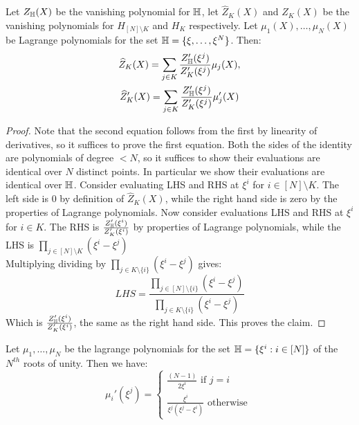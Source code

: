 \begin{lemma}\label{lem:zk-hat}
Let $Z_{\mathbb{H}}(X)$ be the vanishing polynomial for $\mathbb{H}$, let $\widehat{Z}_K(X)$ and  $Z_K(X)$ be the vanishing polynomials for $H_{[N]\setminus K}$ and $H_K$ respectively.
Let $\mu_1(X),\ldots,\mu_N(X)$ be Lagrange polynomials for the set $\mathbb{H}=\{\xi,\ldots,\xi^N\}$. Then:
\begin{gather}
    \widehat{Z}_K(X) = \sum_{j\in K}\frac{Z_{\mathbb{H}}'(\xi^j)}{Z_K'(\xi^j)}\mu_j(X), \\
    \widehat{Z}_K'(X)= \sum_{j\in K}\frac{Z_{\mathbb{H}}'(\xi^j)}{Z_K'(\xi^j)}\mu_j'(X)
\end{gather}
\end{lemma}

\begin{proof}
    Note that the second equation follows from the first by linearity of derivatives, so it suffices to prove the first equation.
    Both the sides of the identity are polynomials of degree $<N$, so it suffices to show their evaluations are identical over $N$ distinct points.
    In particular we show their evaluations are identical over $\mathbb{H}$.
    Consider evaluating LHS and RHS at $\xi^i$ for $i \in [N]\setminus K$.
    The left side is $0$ by definition of $\hat{Z}_K(X)$, while the right hand side is zero by the properties of Lagrange polynomials.
    Now consider evaluations LHS and RHS at $\xi^i$ for $i \in K$.
    The RHS is $\frac{Z_{\mathbb{H}}'(\xi^i)}{Z_K'(\xi^i)}$ by properties of Lagrange polynomials, while the
    LHS is $\prod_{j \in [N]\setminus K} (\xi^i-\xi^j)$\\
    Multiplying dividing by $\prod_{ j \in K \setminus \{i\}}(\xi^i-\xi^j)$ gives:
    $$LHS = \frac{\prod_{j \in [N] \setminus \{i\}} (\xi^i-\xi^j)}{\prod_{j \in K \setminus \{i\}}(\xi^i-\xi^j)}$$
    Which is $\frac{Z_{\mathbb{H}}'(\xi^i)}{Z_K'(\xi^i)}$, the same as the right hand side.
    This proves the claim.
\end{proof}

\begin{lemma}\label{lem:lamda-deriv}
Let $\mu_1,\ldots,\mu_N$ be the lagrange polynomials for the set $\mathbb{H}=\{\xi^i:i\in [N]\}$
of the $N^{th}$ roots of unity. Then we have:
\begin{equation*}
    \mu_i'(\xi^j) = \begin{cases}
                        \frac{(N-1)}{2\xi^{i}}  \text{ if } j=i\\
                        \frac{\xi^i}{\xi^j(\xi^j-\xi^i)} \text{ otherwise }
    \end{cases}
\end{equation*}
\end{lemma}

